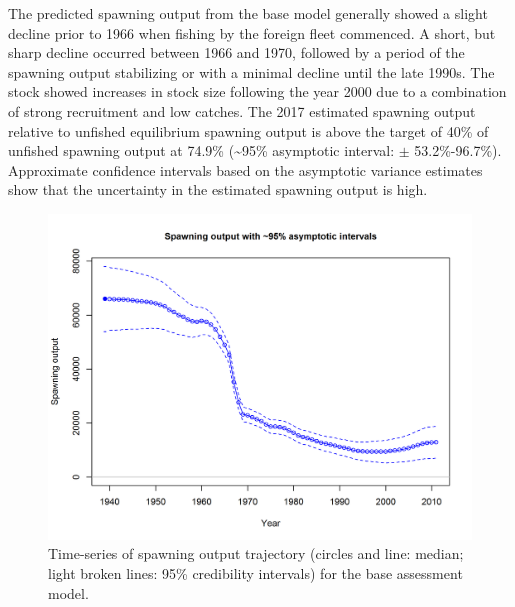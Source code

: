 \documentclass[12pt,]{article}
\begin{document}
The predicted spawning output from the base model generally showed a
slight decline prior to 1966 when fishing by the foreign fleet
commenced. A short, but sharp decline occurred between 1966 and 1970,
followed by a period of the spawning output stabilizing or with a
minimal decline until the late 1990s. The stock showed increases in
stock size following the year 2000 due to a combination of strong
recruitment and low catches. The 2017 estimated spawning output relative
to unfished equilibrium spawning output is above the target of 40\% of
unfished spawning output at 74.9\% (\textasciitilde{}95\% asymptotic
interval: \(\pm\) 53.2\%-96.7\%). Approximate confidence intervals based
on the asymptotic variance estimates show that the uncertainty in the
estimated spawning output is high.

\begin{figure}
\centering
\includegraphics{r4ss/plots_mod1/ts7_Spawning_output_with_95_asymptotic_intervals_intervals.png}
\caption{Time-series of spawning output trajectory (circles and line:
median; light broken lines: 95\% credibility intervals) for the base
assessment model. \label{fig:Spawnbio_all}}
\end{figure}
\end{document}
